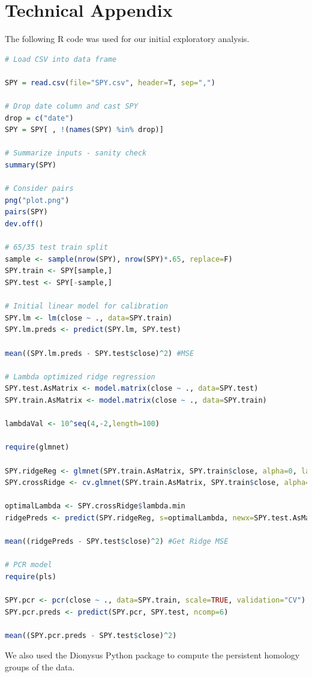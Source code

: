 \documentclass[12pt]{article}
\begin{document}
\newpage
\section{Technical Appendix}
The following R code was used for our initial exploratory analysis.
\begin{lstlisting}[language=R]
# Load CSV into data frame

SPY = read.csv(file="SPY.csv", header=T, sep=",")

# Drop date column and cast SPY
drop = c("date")
SPY = SPY[ , !(names(SPY) %in% drop)]

# Summarize inputs - sanity check
summary(SPY)

# Consider pairs
png("plot.png")
pairs(SPY)
dev.off()

# 65/35 test train split
sample <- sample(nrow(SPY), nrow(SPY)*.65, replace=F)
SPY.train <- SPY[sample,]
SPY.test <- SPY[-sample,]

# Initial linear model for calibration
SPY.lm <- lm(close ~ ., data=SPY.train)
SPY.lm.preds <- predict(SPY.lm, SPY.test)

mean((SPY.lm.preds - SPY.test$close)^2) #MSE

# Lambda optimized ridge regression
SPY.test.AsMatrix <- model.matrix(close ~ ., data=SPY.test)
SPY.train.AsMatrix <- model.matrix(close ~ ., data=SPY.train)

lambdaVal <- 10^seq(4,-2,length=100)

require(glmnet)

SPY.ridgeReg <- glmnet(SPY.train.AsMatrix, SPY.train$close, alpha=0, lambda=lambdaVal, thresh=1e-10)
SPY.crossRidge <- cv.glmnet(SPY.train.AsMatrix, SPY.train$close, alpha=0, lambda=lambdaVal, thresh=1e-10)

optimalLambda <- SPY.crossRidge$lambda.min
ridgePreds <- predict(SPY.ridgeReg, s=optimalLambda, newx=SPY.test.AsMatrix)

mean((ridgePreds - SPY.test$close)^2) #Get Ridge MSE

# PCR model
require(pls)

SPY.pcr <- pcr(close ~ ., data=SPY.train, scale=TRUE, validation="CV")
SPY.pcr.preds <- predict(SPY.pcr, SPY.test, ncomp=6)

mean((SPY.pcr.preds - SPY.test$close)^2)
\end{lstlisting}

We also used the Dionysus Python package to compute the persistent homology groups of the data.
\end{document}
